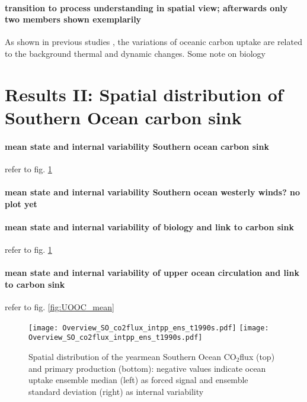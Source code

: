 \documentclass[12pt]{article}
\begin{document}
\paragraph{transition to process understanding in spatial view; afterwards only two members shown exemplarily}
As shown in previous studies \citep{LeQuere2007}, the variations of oceanic carbon uptake are related to the background thermal and dynamic changes. Some note on biology


\clearpage

\section{Results II: Spatial distribution of Southern Ocean carbon sink}


\paragraph{mean state and internal variability Southern ocean carbon sink} 
refer to fig. \ref{fig:SOCS_ensmean_ensstd}

\paragraph{mean state and internal variability Southern ocean westerly winds? no plot yet}

\paragraph{mean state and internal variability of biology and link to carbon sink} 
refer to fig. \ref{fig:SOCS_ensmean_ensstd}

\paragraph{mean state and internal variability of upper ocean circulation and link to carbon sink}
refer to fig. \ref{fig:UOOC_mean}


\begin{figure}[h!]
\centering
\texttt{[image: Overview\_SO\_co2flux\_intpp\_ens\_t1990s.pdf]} %
\texttt{[image: Overview\_SO\_co2flux\_intpp\_ens\_t1990s.pdf]} %
\caption{Spatial distribution of the yearmean Southern Ocean CO$_2$flux (top) and primary production (bottom): negative values indicate ocean uptake ensemble median (left) as forced signal and ensemble standard deviation (right) as internal variability}
\label{fig:SOCS_ensmean_ensstd}
\end{figure}
\end{document}
